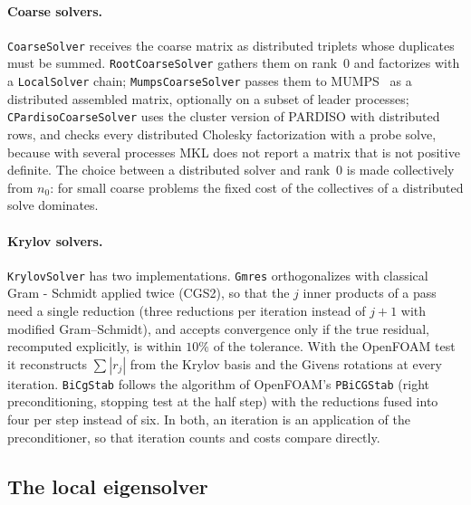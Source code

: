 \documentclass[11pt,a4paper]{article}
\begin{document}
\paragraph{Coarse solvers.} \texttt{CoarseSolver} receives the coarse matrix as distributed triplets whose
duplicates must be summed. \texttt{RootCoarseSolver} gathers them on rank~0 and factorizes with a
\texttt{LocalSolver} chain; \texttt{MumpsCoarseSolver} passes them to MUMPS~\cite{Amestoy2001} as a
distributed assembled matrix, optionally on a subset of leader processes; \texttt{CPardisoCoarseSolver} uses
the cluster version of PARDISO with distributed rows, and checks every distributed Cholesky factorization with
a probe solve, because with several processes MKL does not report a matrix that is not positive definite. The
choice between a distributed solver and rank~0 is made collectively from $n_0$: for small coarse problems the
fixed cost of the collectives of a distributed solve dominates.

\paragraph{Krylov solvers.} \texttt{KrylovSolver} has two implementations. \texttt{Gmres} orthogonalizes
with classical Gram - Schmidt applied twice (CGS2), so that the $j$ inner products of a pass need a single
reduction (three reductions per iteration instead of $j+1$ with modified Gram--Schmidt), and accepts
convergence only if the true residual, recomputed explicitly, is within $10\%$ of the tolerance. With the 
OpenFOAM test it reconstructs $\sum|r_j|$ from the Krylov basis and the Givens rotations at every iteration. 
\texttt{BiCgStab} follows the algorithm of OpenFOAM's \texttt{PBiCGStab} (right preconditioning, stopping test 
at the half step) with the reductions fused into four per step instead of six. In both, an iteration is an 
application of the preconditioner, so that iteration counts and costs compare directly.

\subsection{The local eigensolver}\label{sec:eigensolver}
\end{document}
